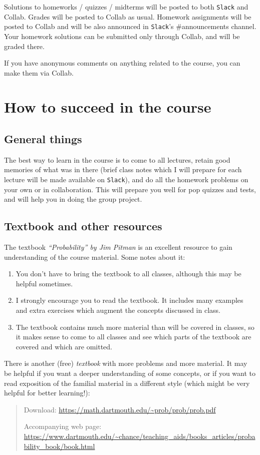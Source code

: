 \documentclass[oneside,11pt]{amsart}
\begin{document}
Solutions to homeworks / quizzes / midterms will be posted to both
\texttt{Slack} and Collab.  Grades will be posted to Collab as usual.  Homework
assignments will be posted to Collab and will be also announced in
\texttt{Slack}'s \#announcements channel. 
Your homework solutions can be submitted only through Collab, and will be graded there.

If you have anonymous comments on anything related to the course, you can make
them via Collab.

\section{How to succeed in the course}
\label{success}

\subsection{General things}

The best way to learn in the course is to 
come to all lectures, retain good memories 
of what was in there
(brief class notes which I will prepare for each lecture 
will be made available on \texttt{Slack}),
and do all the homework problems on your own or in collaboration.
This will prepare you well for pop quizzes and tests, and will help you in 
doing the group project.

\subsection{Textbook and other resources}

The textbook \emph{``Probability'' by Jim Pitman} is an excellent resource 
to gain understanding of the course material. Some notes about it:

\begin{enumerate}[$\bullet$]
	\item You don't have to bring the textbook to all classes, 
		although this may be helpful sometimes. 
	\item I strongly encourage you to read the textbook. It includes many examples and
		extra exercises which augment the concepts discussed in class. 
	\item The textbook contains much more material than will be covered in classes, so it
		makes sense to come to all classes and see which parts of the textbook
		are covered and which are omitted.
\end{enumerate}

There is another (free) \emph{textbook} with more problems and more material. It may be helpful if you want
a deeper understanding of some concepts, or if you want to read exposition of the familial material
in a different style (which might be very helpful for better learning!):
\begin{quote}
	Download: \url{https://math.dartmouth.edu/~prob/prob/prob.pdf}

	\noindent
	Accompanying web page: \url{https://www.dartmouth.edu/~chance/teaching_aids/books_articles/probability_book/book.html}
\end{quote}
\end{document}
